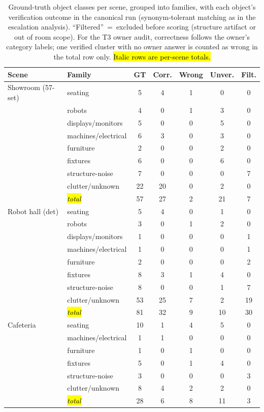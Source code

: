 \documentclass[electronics,article,accept,pdftex,moreauthors]{Definitions/mdpi}
\begin{document}
\begin{table}[H]
\small

\caption{Ground-truth object classes per scene, grouped into families,
with each object's verification outcome in the canonical run
(synonym-tolerant matching as in the escalation analysis). \mbox{``Filtered''
= excluded} before scoring (structure artifact or out of room scope).
For the T3 owner audit, correctness follows the owner's category
labels; one verified cluster with no owner answer is counted as wrong
in the total row only. \hl{Italic rows are per-scene totals.}}
\label{tab:classdist}

\begin{tabularx}{\textwidth}{m{3.4cm}<{\centering}m{3.3cm}<{\centering}cCCCC}
\toprule
\textbf{Scene} & \textbf{Family} & \textbf{GT} & \textbf{Corr.} & \textbf{Wrong} & \textbf{Unver.} & \textbf{Filt.} \\
\midrule
Showroom (57-set) & seating & 5 & 4 & 1 & 0 & 0 \\
 & robots & 4 & 0 & 1 & 3 & 0 \\
 & displays/monitors & 5 & 0 & 0 & 5 & 0 \\
 & machines/electrical & 6 & 3 & 0 & 3 & 0 \\
 & furniture & 2 & 0 & 0 & 2 & 0 \\
 & fixtures & 6 & 0 & 0 & 6 & 0 \\
 & structure-noise & 7 & 0 & 0 & 0 & 7 \\
 & clutter/unknown & 22 & 20 & 0 & 2 & 0 \\
 & \emph{\hl{total}} & 57 & 27 & 2 & 21 & 7 \\%
\midrule
Robot hall (det) & seating & 5 & 4 & 0 & 1 & 0 \\
 & robots & 3 & 0 & 1 & 2 & 0 \\
 & displays/monitors & 1 & 0 & 0 & 0 & 1 \\
 & machines/electrical & 1 & 0 & 0 & 0 & 1 \\
 & furniture & 2 & 0 & 0 & 0 & 2 \\
 & fixtures & 8 & 3 & 1 & 4 & 0 \\
 & structure-noise & 8 & 0 & 0 & 1 & 7 \\
 & clutter/unknown & 53 & 25 & 7 & 2 & 19 \\
 & \emph{\hl{total}} & 81 & 32 & 9 & 10 & 30 \\
\midrule
Cafeteria & seating & 10 & 1 & 4 & 5 & 0 \\
 & machines/electrical & 1 & 1 & 0 & 0 & 0 \\
 & furniture & 1 & 0 & 1 & 0 & 0 \\
 & fixtures & 5 & 0 & 1 & 4 & 0 \\
 & structure-noise & 3 & 0 & 0 & 0 & 3 \\
 & clutter/unknown & 8 & 4 & 2 & 2 & 0 \\
 & \emph{\hl{total}} & 28 & 6 & 8 & 11 & 3 \\


\end{tabularx}
\end{table}
\end{document}
